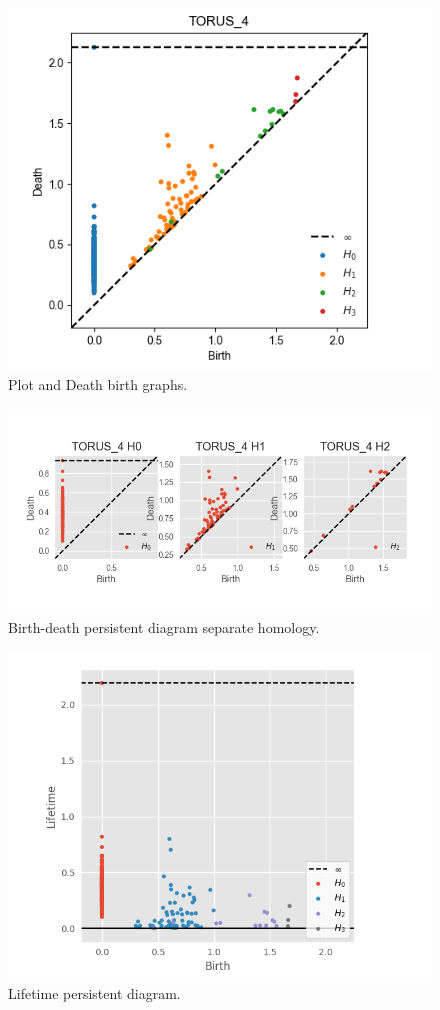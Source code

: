 \documentclass[11pt,a4paper]{report}
\begin{document}
               \begin{figure}[H]
                \centering
                \includegraphics[width=\linewidth]{./ripser/torus4.png}
                \caption{Plot and Death birth graphs.}
                \label{fig:sep hom}
              \end{figure}

              \begin{figure}[H]
                \centering
                \includegraphics[width=\linewidth]{./ripser/torus4_sep.png}
                \caption{Birth-death persistent diagram separate homology.}
                \label{fig:sep hom}
              \end{figure}

              \begin{figure}[H]
                \centering
                \includegraphics[width=0.5\linewidth, scale=0.5]{./ripser/torus4_lifetime.png}
                \caption{Lifetime persistent diagram.}
                \label{fig:sep hom}
              \end{figure}
              
\end{document}
